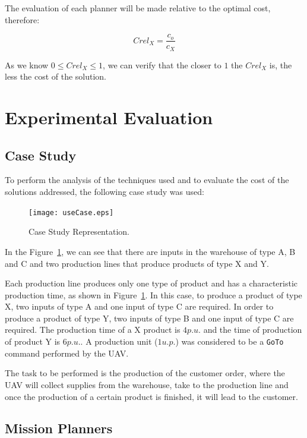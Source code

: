 \documentclass[conference,harvard,brazil,english]{sbatex}
\begin{document}
The evaluation of each planner will be made relative to the optimal cost, therefore:

\begin{equation}
Crel_X=\frac{c_o}{c_X}
\end{equation}

As we know $0 \leq Crel_X \leq 1$, we can verify that the closer to $1$ the $Crel_X$ is, the less the cost of the solution.

\section{Experimental Evaluation}
\label{sec:results}
 
\subsection{Case Study}
\label{sec:ec}

To perform the analysis of the techniques used and to evaluate the cost of the solutions addressed, the following case study was used:

	\begin{figure}[H]
	\centering
	\texttt{[image: useCase.eps]}
	\caption{Case Study Representation.\label{fig:useCase}}
	\end{figure}
	
In the Figure~\ref{fig:useCase}, we can see that there are inputs in the warehouse of type A, B and C and two production lines that produce products of type X and Y.

Each production line produces only one type of product and has a characteristic production time, as shown in Figure~\ref{fig:useCase}. In this case, to produce a product of type X, two inputs of type A and one input of type C are required. In order to produce a product of type Y, two inputs of type B and one input of type C are required. The production time of a X product is $4p.u.$ and the time of production of product Y is $6p.u.$. A production unit ($1u.p.$) was considered to be a \texttt{GoTo} command performed by the UAV.

The task to be performed is the production of the customer order, where the UAV will collect supplies from the warehouse, take to the production line and once the production of a certain product is finished, it will lead to the customer.

\subsection{Mission Planners}
\end{document}
